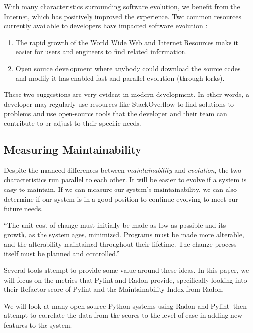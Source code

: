 With many characteristics surrounding software evolution, we benefit from the Internet, which has positively improved the experience. Two common resources currently available to developers have impacted software evolution \cite{wiki:software-evolution}:

\vspace{0.25cm}
\begin{enumerate}
    \item The rapid growth of the World Wide Web and Internet Resources make it easier for users and engineers to find related information.
    \item Open source development where anybody could download the source codes and modify it has enabled fast and parallel evolution (through forks).
\end{enumerate}
\vspace{0.25cm}

These two suggestions are very evident in modern development. In other words, a developer may regularly use resources like StackOverflow to find solutions to problems and use open-source tools that the developer and their team can contribute to or adjust to their specific needs.

\subsection{Measuring Maintainability} \label{subMeasureMaintainability}

Despite the nuanced differences between \textit{maintainability} and \textit{evolution}, the two characteristics run parallel to each other. It will be easier to evolve if a system is easy to maintain. If we can measure our system's maintainability, we can also determine if our system is in a good position to continue evolving to meet our future needs.

\vspace{0.25cm}
\begin{displayquote}
``The unit cost of change must initially be made as low as possible and its growth, as the system ages, minimized. Programs must be made more alterable, and the alterability maintained throughout their lifetime. The change process itself must be planned and controlled.'' \cite{lehman:1980}
\end{displayquote}
\vspace{0.25cm}

Several tools attempt to provide some value around these ideas. In this paper, we will focus on the metrics that Pylint and Radon provide, specifically looking into their Refactor score of Pylint and the Maintainability Index from Radon.

We will look at many open-source Python systems using Radon and Pylint, then attempt to correlate the data from the scores to the level of ease in adding new features to the system.
